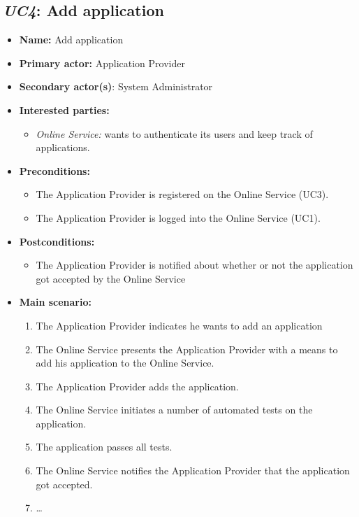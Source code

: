 \documentclass[english,peerreview]{sareport}
\begin{document}
\subsection{\emph{UC4}: Add application}
\begin{itemize}
    \item \textbf{Name:} Add application
    \item \textbf{Primary actor:} Application Provider
    \item \textbf{Secondary actor(s)}: System Administrator
    \item \textbf{Interested parties:} 
        \begin{itemize}
            \item \textit{Online Service:} wants to authenticate its users and keep track of applications.
        \end{itemize}

    \item \textbf{Preconditions:}
        \begin{itemize}
            \item The Application Provider is registered on the Online Service (UC3).
            \item The Application Provider is logged into the Online Service (UC1).
        \end{itemize}

    \item \textbf{Postconditions:}
        \begin{itemize}
            \item The Application Provider is notified about whether or not the application got accepted by the Online Service
        \end{itemize}
        
    \item \textbf{Main scenario:} 
    \begin{enumerate}
       \item The Application Provider indicates he wants to add an application
       \item The Online Service presents the Application Provider with a means to add his application to the Online Service.
       \item The Application Provider adds the application.
	\item The Online Service initiates a number of automated tests on the application.
	\item The application passes all tests.
	\item The Online Service notifies the Application Provider that the application got accepted.
       \item \ldots
    \end{enumerate}


\end{itemize}
\end{document}
